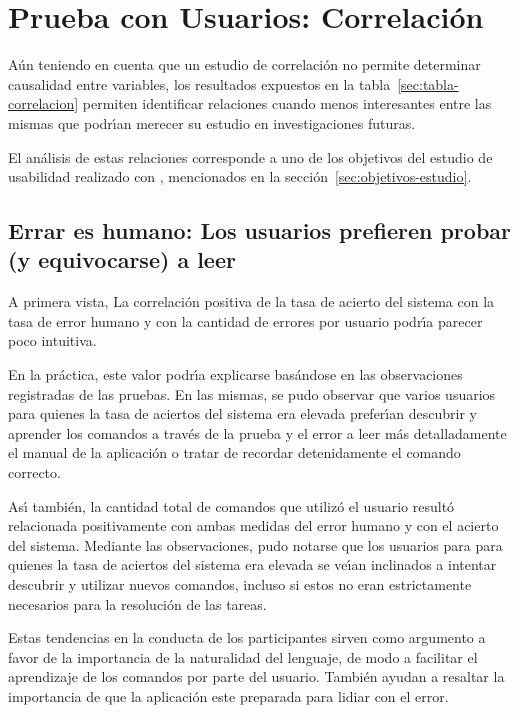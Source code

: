 \section{Prueba con Usuarios: Correlaci\'on}
A\'un teniendo en cuenta que un estudio de correlaci\'on no permite determinar causalidad
entre variables, los resultados expuestos en la tabla~\ref{sec:tabla-correlacion} 
permiten identificar relaciones cuando menos interesantes entre las mismas que podr{{\'\i}}an
merecer su estudio en investigaciones futuras.

El an\'alisis de estas relaciones corresponde a uno de los objetivos del estudio de usabilidad
realizado con , mencionados en la secci\'on~\ref{sec:objetivos-estudio}.

\subsection[Errar es humano: Los usuarios prefieren probar (y equivocarse) a leer]
{Errar es humano: Los usuarios prefieren probar \\ (y equivocarse) a leer}
A primera vista, La correlaci\'on positiva de la tasa de acierto del sistema con la
tasa de error humano y con la cantidad de errores por usuario podr{{\'\i}}a parecer
poco intuitiva.

En la pr\'actica, este valor podr{{\'\i}}a explicarse bas\'andose en las observaciones registradas 
de las pruebas. En las mismas, se pudo observar que varios usuarios para quienes la tasa de
aciertos del sistema era elevada prefer{{\'\i}}an descubrir y aprender los comandos a trav\'es
de la prueba y el error a leer m\'as detalladamente el manual de la aplicaci\'on o tratar de
recordar detenidamente el comando correcto.

As{{\'\i}} tambi\'en, la cantidad total de comandos que utiliz\'o el usuario result\'o relacionada
positivamente con ambas medidas del error humano y con el acierto del sistema. Mediante las 
observaciones, pudo notarse que los usuarios para para quienes la tasa de
aciertos del sistema era elevada se ve{{\'\i}}an inclinados a intentar descubrir y utilizar nuevos
comandos, incluso si estos no eran estrictamente necesarios para la resoluci\'on de las tareas.

Estas tendencias en la conducta de los participantes sirven como argumento a favor de la importancia 
de la naturalidad del lenguaje, de modo a facilitar el aprendizaje de los comandos por parte del usuario.
Tambi\'en ayudan a resaltar la importancia de que la aplicaci\'on este preparada para lidiar con el error.

